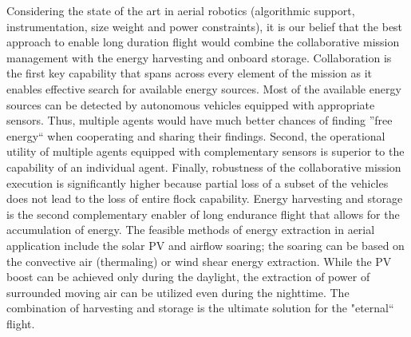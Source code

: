 \documentclass{ifacconf}
\begin{document}
%

Considering the state of the art in aerial robotics (algorithmic support,
instrumentation, size weight and power constraints), it is our belief that
the best approach to enable long duration flight would combine the
collaborative mission management with the energy harvesting and onboard
storage. Collaboration is the first key capability that spans across every
element of the mission as it enables effective search for available energy
sources. Most of the available energy sources can be detected by autonomous
vehicles equipped with appropriate sensors. Thus, multiple agents would have
much better chances of finding ''free energy`` when cooperating and sharing
their findings. Second, the operational utility of multiple agents equipped
with complementary sensors is superior to the capability of an individual
agent. Finally, robustness of the collaborative mission execution is
significantly higher because partial loss of a subset of the vehicles does
not lead to the loss of entire flock capability. Energy harvesting and
storage is the second complementary enabler of long endurance flight that
allows for the accumulation of energy. The feasible methods of energy
extraction in aerial application include the solar PV and airflow soaring;
the soaring can be based on the convective air (thermaling) or wind shear
energy extraction. While the PV boost can be achieved only during the
daylight, the extraction of power of surrounded moving air can be utilized
even during the nighttime. The combination of harvesting and storage is the
ultimate solution for the "eternal`` flight.
\end{document}
